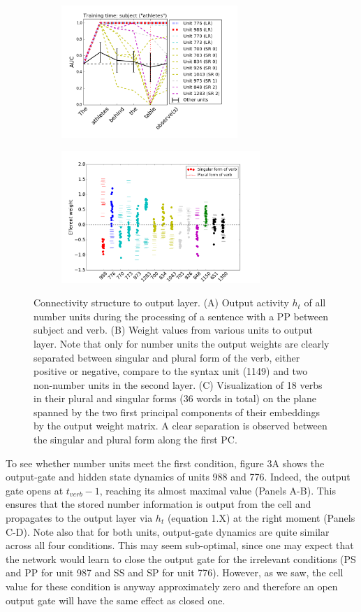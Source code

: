 \begin{figure}[t!]
    \centering
    \begin{subfigure}{0.5\textwidth}
            \centering
            \includegraphics[height=5cm]{Figures/GAT1d_cell_nounpp_SR_LR_single_unit.png}
    \label{fig:fig1}
    \end{subfigure}
\begin{subfigure}{0.5\textwidth}
            \centering
            \includegraphics[height=5cm]{Figures/Figure5_output_weights.png}
    \label{fig:fig2}
    \end{subfigure}
    \caption{Connectivity structure to output layer. 
(A) Output activity $h_t$ of all number units during the processing of a sentence with a PP between subject and verb. 
(B) Weight values from various units to output layer. 
Note that only for number units the output weights are clearly separated between singular and plural form of the verb, either positive or negative, compare to the syntax unit (1149) and two non-number units in the second layer. 
(C) Visualization of 18 verbs in their plural and singular forms (36 words in total) on the plane spanned by the two first principal components of their embeddings by the output weight matrix. 
A clear separation is observed between the singular and plural form along the first PC.}


\end{figure}


To see whether number units meet the first condition, figure 3A shows the output-gate and hidden state dynamics of units 988 and 776. 
Indeed, the output gate opens at $t_{verb}-1$, reaching its almost maximal value (Panels A-B). 
This ensures that the stored number information is output from the cell and propagates to the output layer via $h_t$ (equation 1.X) at the right moment (Panels C-D). 
Note also that for both units, output-gate dynamics are quite similar across all four conditions. 
This may seem sub-optimal, since one may expect that the network would learn to close the output gate for the irrelevant conditions (PS and PP for unit 987 and SS and SP for unit 776). 
However, as we saw, the cell value for these condition is anyway approximately zero and therefore an open output gate will have the same effect as closed one.

